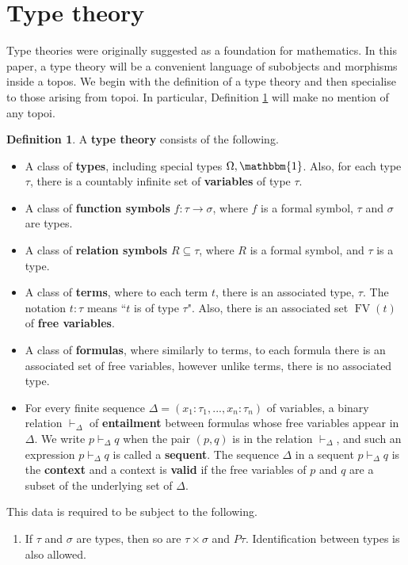\documentclass{birkjour}
\theoremstyle{plain}
\theoremstyle{definition}
\newtheorem{definition}[thm]{Definition} %
\begin{document}
	\section{Type theory}\label{sec:type_theory}
	Type theories were originally suggested as a foundation for mathematics. In this paper, a type theory will be a convenient language of subobjects and morphisms inside a topos. We begin with the definition of a type theory and then specialise to those arising from topoi. In particular, Definition \ref{def:type_theory} will make no mention of any topoi.
	\begin{definition}
		\label{def:type_theory}
		A \textbf{type theory} consists of the following.
		\begin{itemize}
			\item A class of \textbf{types}, including special types $\Omega, \mathbbm{1}$. Also, for each type $\tau$, there is a countably infinite set of \textbf{variables} of type $\tau$.
			\item A class of \textbf{function symbols} $f: \tau \to \sigma$, where $f$ is a formal symbol, $\tau$ and $\sigma$ are types.
			\item A class of \textbf{relation symbols} $R \subseteq \tau$, where $R$ is a formal symbol, and $\tau$ is a type.
			\item A class of \textbf{terms}, where to each term $t$, there is an associated type, $\tau$. The notation $t : \tau$ means ``$t$ is of type $\tau$". Also, there is an associated set $\operatorname{FV}(t)$ of \textbf{free variables}.
			\item A class of \textbf{formulas}, where similarly to terms, to each formula there is an associated set of free variables, however unlike terms, there is no associated type.
			\item For every finite sequence $\Delta = (x_1:\tau_1,...,x_n:\tau_n)$ of variables, a binary relation $\vdash_\Delta$ of \textbf{entailment} between formulas whose free variables appear in $\Delta$. We write $p \vdash_\Delta q$ when the pair $(p,q)$ is in the relation $\vdash_\Delta$, and such an expression $p \vdash_\Delta q$ is called a \textbf{sequent}. The sequence $\Delta$ in a sequent $p \vdash_\Delta q$ is the \textbf{context} and a context is \textbf{valid} if the free variables of $p$ and $q$ are a subset of the underlying set of $\Delta$.
		\end{itemize}
		This data is required to be subject to the following.
		\begin{enumerate}
			\item If $\tau$ and $\sigma$ are types, then so are $\tau \times \sigma$ and $P\tau$. Identification between types is also allowed.\\\\

\end{enumerate}
\end{definition}
\end{document}
